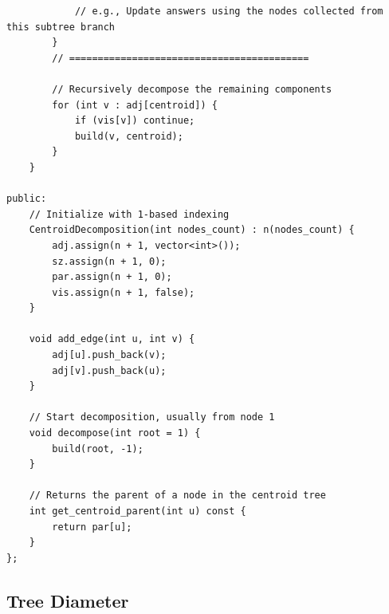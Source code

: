 \documentclass[9pt,a4paper,twocolumn]{extarticle}
\begin{document}
\begin{lstlisting}
            // e.g., Update answers using the nodes collected from this subtree branch
        }
        // ==========================================

        // Recursively decompose the remaining components
        for (int v : adj[centroid]) {
            if (vis[v]) continue;
            build(v, centroid);
        }
    }

public:
    // Initialize with 1-based indexing
    CentroidDecomposition(int nodes_count) : n(nodes_count) {
        adj.assign(n + 1, vector<int>());
        sz.assign(n + 1, 0);
        par.assign(n + 1, 0);
        vis.assign(n + 1, false);
    }

    void add_edge(int u, int v) {
        adj[u].push_back(v);
        adj[v].push_back(u);
    }

    // Start decomposition, usually from node 1
    void decompose(int root = 1) {
        build(root, -1);
    }

    // Returns the parent of a node in the centroid tree
    int get_centroid_parent(int u) const {
        return par[u];
    }
};
\end{lstlisting}

\subsection{Tree Diameter}

\filbreak
\end{document}
